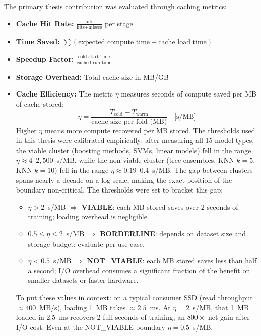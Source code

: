 The primary thesis contribution was evaluated through caching metrics:

\begin{itemize}
\item \textbf{Cache Hit Rate:} $\frac{\text{hits}}{\text{hits} + \text{misses}}$ per stage
\item \textbf{Time Saved:} $\sum(\text{expected\_compute\_time} - \text{cache\_load\_time})$
\item \textbf{Speedup Factor:} $\frac{\text{cold\_start\_time}}{\text{cached\_run\_time}}$
\item \textbf{Storage Overhead:} Total cache size in MB/GB
\item \textbf{Cache Efficiency:} The metric $\eta$ measures seconds of compute
 saved per MB of cache stored:
 \begin{equation}
 \eta = \frac{T_{\text{cold}} - T_{\text{warm}}}{\text{cache size per fold (MB)}}
 \quad \text{[s/MB]}
 \end{equation}
 Higher $\eta$ means more compute recovered per MB stored.
 The thresholds used in this thesis were calibrated empirically: after
 measuring all 15 model types, the viable cluster (boosting methods, SVMs,
 linear models) fell in the range $\eta \approx 4$--$2{,}500$~s/MB,
 while the non-viable cluster (tree ensembles, KNN $k=5$, KNN $k=10$) fell in the range
 $\eta \approx 0.19$--$0.4$~s/MB. The gap between clusters spans nearly a
 decade on a log scale, making the exact position of the boundary
 non-critical. The thresholds were set to bracket this gap:
 \begin{itemize}
 \item $\eta > 2$~s/MB $\Rightarrow$ \textbf{VIABLE}: each MB stored saves
 over 2 seconds of training; loading overhead is negligible.
 \item $0.5 \leq \eta \leq 2$~s/MB $\Rightarrow$ \textbf{BORDERLINE}:
 depends on dataset size and storage budget; evaluate per use case.
 \item $\eta < 0.5$~s/MB $\Rightarrow$ \textbf{NOT\_VIABLE}: each MB stored
 saves less than half a second; I/O overhead consumes a significant
 fraction of the benefit on smaller datasets or faster hardware.
 \end{itemize}
 To put these values in context: on a typical consumer SSD
 (read throughput $\approx 400$~MB/s), loading 1~MB takes
 $\approx 2.5$~ms. At $\eta = 2$~s/MB, that 1~MB loaded in 2.5~ms
 recovers 2 full seconds of training, an $800{\times}$ net gain
 after I/O cost. Even at the NOT\_VIABLE boundary $\eta = 0.5$~s/MB,

\end{itemize}
